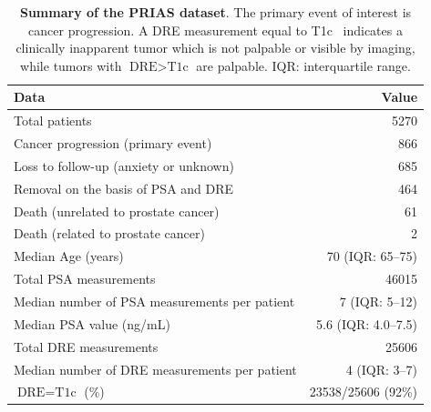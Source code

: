 \begin{table}
\small
\centering
\caption{\textbf{Summary of the PRIAS dataset}. The primary event of interest is cancer progression. A DRE measurement equal to T1c~\citep{schroder1992tnm} indicates a clinically inapparent tumor which is not palpable or visible by imaging, while tumors with $\mbox{DRE} > \mbox{T1c}$ are palpable. IQR: interquartile range.}
\label{c3:table:1}
\begin{tabular}{lr}
\toprule
Data & Value\\
\midrule
Total patients & 5270\\
Cancer progression (primary event) & 866\\
Loss to follow-up (anxiety or unknown) & 685\\
Removal on the basis of PSA and DRE & 464\\
Death (unrelated to prostate cancer) & 61\\
Death (related to prostate cancer) & 2\\
\midrule
Median Age (years) & 70 (IQR: 65--75)\\
Total PSA measurements & 46015\\
Median number of PSA measurements per patient &  7 (IQR: 5--12)\\
Median PSA value (ng/mL) & 5.6 (IQR: 4.0--7.5)\\
Total DRE measurements & 25606\\
Median number of DRE measurements per patient & 4 (IQR: 3--7)\\
$\mbox{DRE} = \mbox{T1c}$ (\%) & 23538/25606 (92\%) \\
\bottomrule
\end{tabular}
\end{table}

